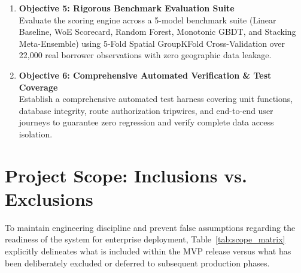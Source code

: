 \begin{enumerate}
  \item \textbf{Objective 5: Rigorous Benchmark Evaluation Suite}\\
  Evaluate the scoring engine across a 5-model benchmark suite (Linear Baseline, WoE Scorecard, Random Forest, Monotonic GBDT, and Stacking Meta-Ensemble) using 5-Fold Spatial GroupKFold Cross-Validation over 22,000 real borrower observations with zero geographic data leakage.

  \item \textbf{Objective 6: Comprehensive Automated Verification \& Test Coverage}\\
  Establish a comprehensive automated test harness covering unit functions, database integrity, route authorization tripwires, and end-to-end user journeys to guarantee zero regression and verify complete data access isolation.
\end{enumerate}

\section{Project Scope: Inclusions vs. Exclusions}
To maintain engineering discipline and prevent false assumptions regarding the readiness of the system for enterprise deployment, Table~\ref{tab:scope_matrix} explicitly delineates what is included within the MVP release versus what has been deliberately excluded or deferred to subsequent production phases.

